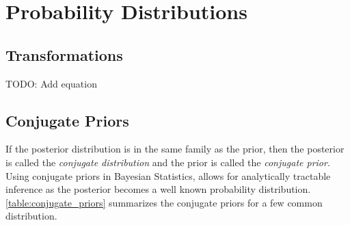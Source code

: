 \section{Probability Distributions}

\subsection{Transformations}
TODO: Add equation

\subsection{Conjugate Priors}\label{sec:theory_conjugate_priors}
If the posterior distribution is in the same family as the prior, then the posterior is called the \textit{conjugate distribution} and the prior is called the \textit{conjugate prior}. Using conjugate priors in Bayesian Statistics, allows for analytically tractable inference as the posterior becomes a well known probability distribution. \cref{table:conjugate_priors} summarizes the conjugate priors for a few common distribution.



